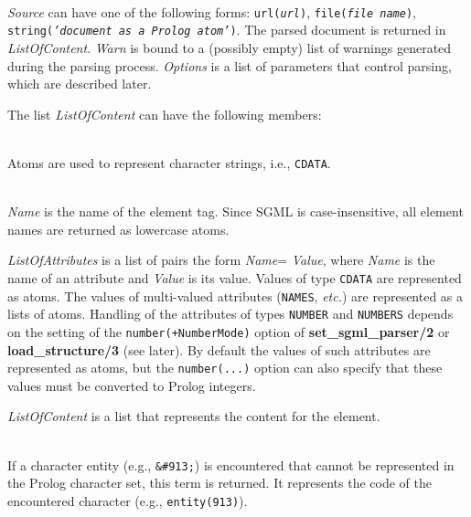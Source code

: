 \begin{description}
\item[{\bf load\_structure}{\bf (}{\it +Source, -ListOfContent, +Options, -Warn}{\bf )}]\mbox{}
  \\
  {\it Source} can have one of the following forms:
   {\tt url({\it {url}})}, {\tt file({\it file name})},
  {\tt string({\it 'document as a Prolog atom'})}.
  The parsed document is returned in {\it ListOfContent}.
  {\it Warn} is bound to a (possibly empty) list of warnings generated
  during the parsing process.
  {\it Options} is a list of parameters that control parsing, which are
  described later.

  The list {\it ListOfContent}  can have the following members:
  \begin{description}
  \item[A Prolog atom]\mbox{}\\
    Atoms are used to represent character strings, i.e., {\tt CDATA}. 

  \item[{\bf element}{\bf (}{\it Name, ListOfAttributes, ListOfContent}{\bf
    )}]\mbox{}\\{\it Name} is the name of the element tag. Since SGML is 
    case-insensitive, all element names are returned as lowercase atoms.
    
    {\it ListOfAttributes} is a list of pairs the form {\it Name}={\it
      Value}, where \emph{Name} is the name of an attribute and
    \emph{Value} is its value.  Values of type {\tt CDATA} are represented
    as atoms. The values of multi-valued attributes ({\tt NAMES},
    \emph{etc.}) are represented as a lists of atoms.  Handling of the
    attributes of types {\tt NUMBER} and {\tt NUMBERS} depends on the
    setting of the {\tt number(+NumberMode)} option of {\bf
      set\_sgml\_parser/2} or {\bf load\_structure/3} (see later).  By
    default the values of such attributes
    are represented as atoms, but the {\tt number(...)} option can also 
    specify that these values must be converted to
    Prolog integers.
    
    {\it ListOfContent} is a list that represents
    the content for the element.

  \item[{\bf entity}{\bf (}{\it Code}{\bf )}]\mbox{}\\
    If a character entity (e.g., \verb$&#913;$) is encountered that 
    cannot be represented in the Prolog character set, this term is 
    returned. It represents the code of the encountered character (e.g.,
    {\tt entity(913)}).


\end{description}
\end{description}
